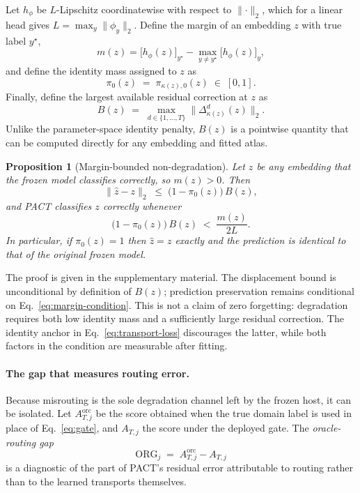 \documentclass[letterpaper]{article} %
\newtheorem{proposition}{Proposition}
\begin{document}
Let $h_\phi$ be $L$-Lipschitz coordinatewise with respect to $\lVert\cdot\rVert_2$,
which for a linear head gives $L=\max_y \lVert \phi_y\rVert_2$. Define the margin
of an embedding $z$ with true label $y^{\star}$,
\begin{equation}
m(z)
=
\big[h_\phi(z)\big]_{y^{\star}}
-
\max_{y\neq y^{\star}}\big[h_\phi(z)\big]_{y},
\end{equation}
and define the identity mass assigned to $z$ as
\begin{equation}
\pi_0(z) \;=\; \pi_{\kappa(z),0}(z) \;\in\; [0,1].
\end{equation}
Finally, define the largest available residual correction at $z$ as
\begin{equation}
B(z) \;=\; \max_{d\in\{1,\ldots,T\}}
\big\lVert\Delta^d_{\kappa(z)}(z)\big\rVert_2.
\end{equation}
Unlike the parameter-space identity penalty, $B(z)$ is a pointwise quantity
that can be computed directly for any embedding and fitted atlas.

\begin{proposition}[Margin-bounded non-degradation]
\label{prop:margin}
Let $z$ be any embedding that the frozen model classifies correctly, so
$m(z)>0$. Then
\begin{equation}
\big\lVert \hat z - z \big\rVert_2 \;\le\; \big(1-\pi_0(z)\big)\,B(z) ,
\end{equation}
and \textsc{PACT} classifies $z$ correctly whenever
\begin{equation}
\big(1-\pi_0(z)\big)\,B(z) \;<\; \frac{m(z)}{2L}.
\label{eq:margin-condition}
\end{equation}
In particular, if $\pi_0(z)=1$ then $\hat z = z$ exactly and the prediction is
identical to that of the original frozen model.
\end{proposition}

The proof is given in the supplementary material. The displacement bound is
unconditional by definition of $B(z)$; prediction preservation remains
conditional on Eq.~\eqref{eq:margin-condition}. This is not a claim of zero
forgetting: degradation requires both low identity mass and a sufficiently
large residual correction. The identity anchor in
Eq.~\eqref{eq:transport-loss} discourages the latter, while both factors in the
condition are measurable after fitting.

\paragraph{The gap that measures routing error.}
Because misrouting is the sole degradation channel left by the frozen host, it
can be isolated. Let
$A^{\mathrm{orc}}_{T,j}$ be the score obtained when the true domain label is used
in place of Eq.~\eqref{eq:gate}, and $A_{T,j}$ the score under the deployed gate.
The \emph{oracle-routing gap}
\begin{equation}
\mathrm{ORG}_{j} \;=\; A^{\mathrm{orc}}_{T,j} - A_{T,j}
\end{equation}
is a diagnostic of the part of PACT's residual error attributable to routing
rather than to the learned transports themselves.
\end{document}
